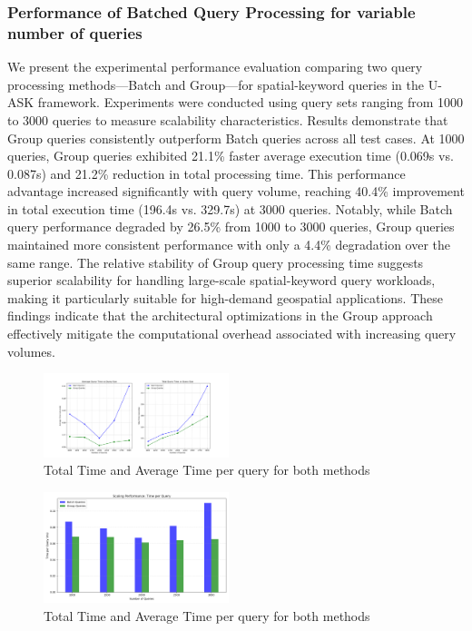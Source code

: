 \documentclass[conference]{IEEEtran}
\begin{document}
\subsubsection{Performance of Batched Query Processing for variable number of queries}
We present the experimental performance evaluation comparing two query processing methods—Batch and Group—for spatial-keyword queries in the U-ASK framework. Experiments were conducted using query sets ranging from 1000 to 3000 queries to measure scalability characteristics. Results demonstrate that Group queries consistently outperform Batch queries across all test cases. At 1000 queries, Group queries exhibited 21.1\% faster average execution time (0.069s vs. 0.087s) and 21.2\% reduction in total processing time. This performance advantage increased significantly with query volume, reaching 40.4\% improvement in total execution time (196.4s vs. 329.7s) at 3000 queries. Notably, while Batch query performance degraded by 26.5\% from 1000 to 3000 queries, Group queries maintained more consistent performance with only a 4.4\% degradation over the same range. The relative stability of Group query processing time suggests superior scalability for handling large-scale spatial-keyword query workloads, making it particularly suitable for high-demand geospatial applications. These findings indicate that the architectural optimizations in the Group approach effectively mitigate the computational overhead associated with increasing query volumes.

\begin{figure}[htbp]
    \centering
    \includegraphics[width=0.48\textwidth]{Figure_4.png}
    \caption{Total Time and Average Time per query for both methods}
    \label{fig:5}
\end{figure}

\begin{figure}[htbp]
    \centering
    \includegraphics[width=0.48\textwidth]{Figure_2.png}
    \caption{Total Time and Average Time per query for both methods}
    \label{fig:6}
\end{figure}
\end{document}
